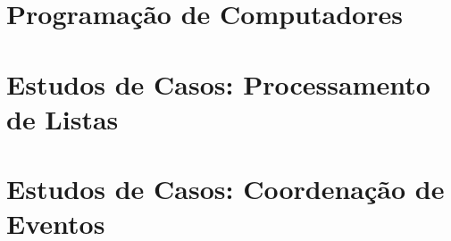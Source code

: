 \documentclass[relatorio]{tex/unemat-comp}
\begin{document}
\chapter{Programação de Computadores}
\label{chap:prog}


\chapter{Estudos de Casos: Processamento de Listas}
\label{chap:processamentoDeListas}


\chapter{Estudos de Casos: Coordenação de Eventos}
\label{chap:coordenacaoDeEventos}






\cleardoublepage


\arial
\printbibliography[heading=bibintoc,title=\refname]


\end{document}
